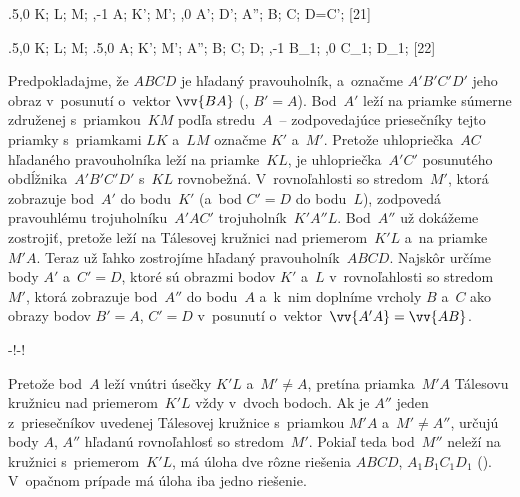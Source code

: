 {%
\fontplace
\tpoint\xy.5,0 K; \rbpoint L; \lpoint M; \rtpoint{},-1 A;
\rbpoint K'; \bpoint M';
\rBpoint{},0 A'; \bpoint D';
\rpoint A''; \tpoint B; \tpoint C; \lpoint D=C';
[21] \hfil\Obr

\fontplace
\tpoint\xy.5,0 K; \rbpoint L; \lpoint M; \rbpoint\xy.5,0 A;
\rbpoint K'; \bpoint M';
\rpoint A''; \tpoint B; \tpoint C; \lBpoint D;
\rbpoint{},-1 B_1; \lbpoint{},0 C_1; \tpoint D_1;
[22] \hfil\Obr

Predpokladajme, že $ABCD$ je hľadaný pravouholník, a~označme
$A'B'C'D'$ jeho obraz v~posunutí o~vektor $\vv{BA}$ (\obr,
$B'=A$). Bod~$A'$ leží na priamke súmerne združenej s~priamkou~$KM$
podľa stredu~$A$~-- zodpovedajúce priesečníky tejto priamky
s~priamkami $LK$ a~$LM$ označme $K'$ a~$M'$. Pretože uhlopriečka~$AC$
hľadaného pravouholníka leží na priamke~$KL$, je uhlopriečka~$A'C'$
posunutého obdĺžnika~$A'B'C'D'$ s~$KL$ rovnobežná.
V~rovnoľahlosti so stredom~$M'$, ktorá zobrazuje bod~$A'$ do
bodu~$K'$ (a~bod $C'=D$ do bodu~$L$), zodpovedá pravouhlému trojuholníku~$A'AC'$
trojuholník~$K'A''L$. Bod~$A''$ už dokážeme zostrojiť, pretože
leží na Tálesovej kružnici nad priemerom~$K'L$ a~na priamke~$M'A$.
Teraz už ľahko zostrojíme hľadaný pravouholník~$ABCD$. Najskôr
určíme body $A'$ a~$C'=D$, ktoré sú obrazmi bodov $K'$ a~$L$ v~rovnoľahlosti
so stredom~$M'$, ktorá zobrazuje bod~$A''$ do
bodu~$A$ a~k~nim doplníme vrcholy $B$ a~$C$ ako obrazy bodov
$B'=A$, $C'=D$ v~posunutí o~vektor~$\vv{A'A}=\vv{AB}$.

\midinsert
\centerline{\inspicture-!\hss\inspicture-!\qquad}
\endinsert

Pretože bod~$A$ leží vnútri úsečky $K'L$ a~$M'\ne A$, pretína
priamka~$M'A$ Tálesovu kružnicu nad priemerom~$K'L$ vždy v~dvoch
bodoch. Ak je $A''$ jeden z~priesečníkov uvedenej Tálesovej kružnice
s~priamkou $M'A$ a~$M'\ne A''$, určujú body $A$, $A''$ hľadanú
rovnoľahlosť so stredom~$M'$. Pokiaľ teda bod~$M''$ neleží na
kružnici s~priemerom~$K'L$, má úloha dve rôzne riešenia $ABCD$,
$A_1B_1C_1D_1$ (\obr). V~opačnom prípade má úloha iba jedno
riešenie.}

